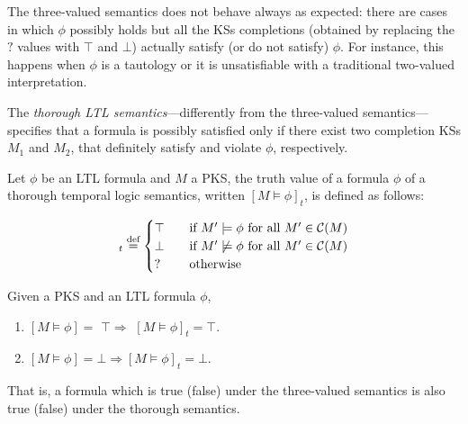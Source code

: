 The three-valued semantics does not behave always as expected: there are cases in which $\phi$ possibly holds but all the KSs completions (obtained by replacing the $?$ values with $\top$ and $\bot$) actually satisfy (or do not satisfy)  $\phi$.
For instance, this happens when $\phi$ is a tautology or it is unsatisfiable with a traditional two-valued interpretation. 

The \emph{thorough LTL semantics}---differently from the three-valued semantics---specifies that a formula is possibly satisfied only if there exist two completion KSs $M_1$ and $M_2$, that definitely satisfy and violate $\phi$, respectively.


\begin{definition}
\label{def:thoroughsemantics}
Let $\phi$ be an LTL formula and $M$ a PKS, the truth value of a formula $\phi$ of a thorough temporal logic semantics, written $[M\models\phi]_t$, is defined as follows:

\begin{equation}
 [M \models\phi]_t \buildrel \text{def}\over = 
                						\begin{cases}
                  								\top & \quad  \text{if}\ M^\prime \models \phi \text{ for all } M^\prime \in \mathcal{C}(M)\\
                  								\bot & \quad  \text{if}\ M^\prime \not\models\phi \text{ for all } M^\prime \in \mathcal{C}(M)\\
                  								? &  \quad  \text{otherwise}
                							  \end{cases}      					  		   
\end{equation}

\end{definition}

\begin{proposition} 
\label{def:mcImpliesGmc}
Given a PKS and an LTL formula $\phi$,
\begin{enumerate}
\item $[M\models\phi] =$ $ \top \Rightarrow$ $ [M\models\phi]_t = \top$.
\item $[M\models\phi] = \bot \Rightarrow [M\models\phi]_t = \bot$.
\end{enumerate}
\end{proposition}
%
That is, a formula which is true (false) under the three-valued semantics is also true (false) under the thorough semantics.

